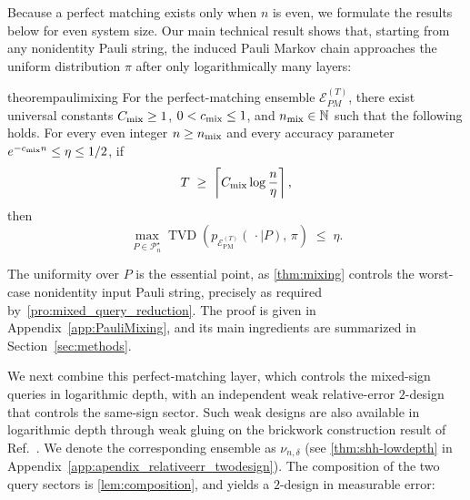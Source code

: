\documentclass[
    aps,
    superscriptaddress,
    onecolumn,
    10pt,
    prx,
    nofootinbib
]{revtex4-2}
\newcommand{\PM}{\mathrm{PM}}
\newcommand{\TVD}{\operatorname{TVD}}
\newcommand{\cP}{\mathcal P}
\newcommand{\cE}{\mathcal E}
\theoremstyle{namedstatement}
\theoremstyle{plain}
\begin{document}
Because a perfect matching exists only when $n$ is even, we formulate the results below for even system size. Our main technical result shows that, starting from any nonidentity Pauli string, the induced Pauli Markov chain approaches the uniform distribution $\pi$ after only logarithmically many layers:


\begin{restatable}
    {theorem}{paulimixing}
\label{thm:mixing}
For the perfect-matching ensemble $\mathcal{E}_{PM}^{(T)}$, there exist
universal constants $C_{\rm mix}\geq 1$, $0<c_{\rm mix}\leq 1$, and
$n_{\rm mix}\in\mathbb{N}$ such that the following holds. For every even
integer $n\geq n_{\rm mix}$ and every accuracy parameter $e^{-c_{\rm mix}n}\leq\eta\leq 1/2$, if
\begin{equation}
\label{eq:t1}
    T \;\geq\;
    \left\lceil C_{\rm mix}\log\frac{n}{\eta}\right\rceil,
\end{equation}
then
\begin{equation}
\label{eq:t2}
    \max_{P\in\cP_n^\star}
    \TVD\!\left(
        p_{\cE_{\PM}^{(T)}}(\,\cdot\mid P),\,
        \pi
    \right)
    \;\leq\;
    \eta.
\end{equation}
\end{restatable}

The uniformity over $P$ is the essential point, as \cref{thm:mixing} controls the worst-case nonidentity input Pauli string, precisely as required by~\cref{pro:mixed_query_reduction}. The proof is given in Appendix~\ref{app:PauliMixing}, and its main ingredients are summarized in Section~\ref{sec:methods}.

We next combine this perfect-matching layer, which controls the mixed-sign queries in logarithmic depth, with an independent weak relative-error $2$-design that controls the same-sign sector. Such weak designs are also available in logarithmic depth through weak gluing on the brickwork construction result of Ref.~\cite{SchusterHaferkampHuang2025}. We denote the corresponding ensemble as $\nu_{n,\delta}$ (see
\cref{thm:shh-lowdepth} in Appendix~\ref{app:apendix_relativeerr_twodesign}). The composition of the two query sectors is \cref{lem:composition}, and yields a $2$-design in measurable error:
\end{document}
